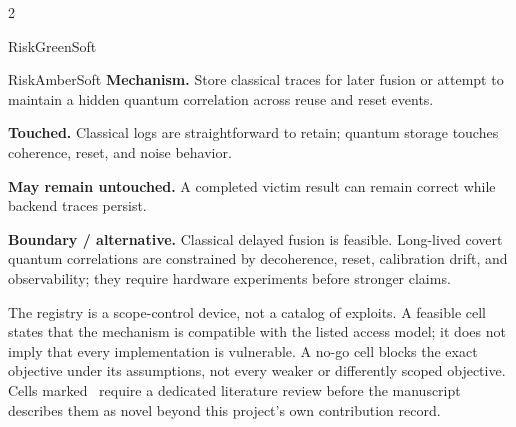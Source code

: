 \begin{multicols}{2}
\begin{matrixrecord}{RiskGreenSoft}
\hfill\matrixback
\end{matrixrecord}

\hypertarget{cell:E6}{}
\begin{matrixrecord}{RiskAmberSoft}
\textbf{Mechanism.} Store classical traces for later fusion or attempt to maintain a hidden quantum correlation across reuse and reset events.

\textbf{Touched.} Classical logs are straightforward to retain; quantum storage touches coherence, reset, and noise behavior.

\textbf{May remain untouched.} A completed victim result can remain correct while backend traces persist.

\textbf{Boundary / alternative.} Classical delayed fusion is feasible. Long-lived covert quantum correlations are constrained by decoherence, reset, calibration drift, and observability; they require hardware experiments before stronger claims.

\hfill\matrixback
\end{matrixrecord}

\end{multicols}

\begin{cautionbox}
The registry is a scope-control device, not a catalog of exploits. A feasible
cell states that the mechanism is compatible with the listed access model; it
does not imply that every implementation is vulnerable. A no-go cell blocks the
exact objective under its assumptions, not every weaker or differently scoped
objective. Cells marked \candidatepriority\ require a dedicated literature
review before the manuscript describes them as novel beyond this project's own
contribution record.
\end{cautionbox}

